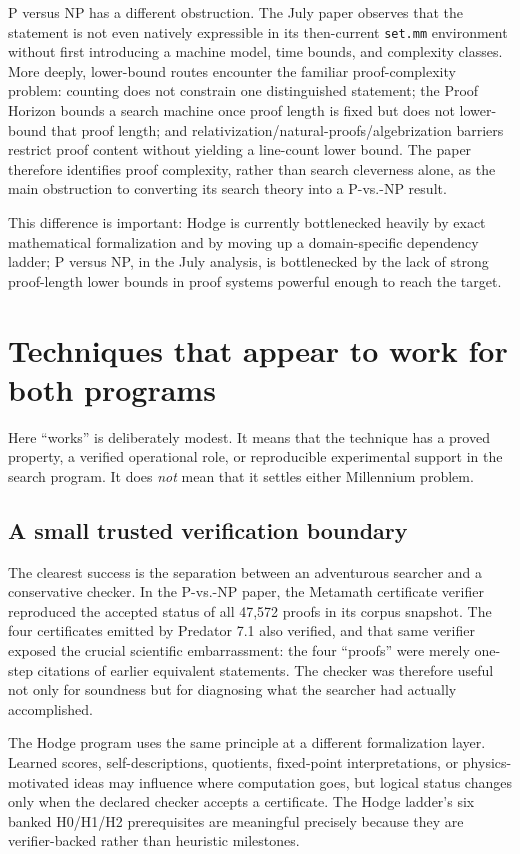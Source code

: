 \documentclass[11pt]{article}
\begin{document}
P versus NP has a different obstruction.  The July paper observes that the statement is not even natively expressible in its then-current \texttt{set.mm} environment without first introducing a machine model, time bounds, and complexity classes.  More deeply, lower-bound routes encounter the familiar proof-complexity problem: counting does not constrain one distinguished statement; the Proof Horizon bounds a search machine once proof length is fixed but does not lower-bound that proof length; and relativization/natural-proofs/algebrization barriers restrict proof content without yielding a line-count lower bound.  The paper therefore identifies proof complexity, rather than search cleverness alone, as the main obstruction to converting its search theory into a P-vs.-NP result.

This difference is important: Hodge is currently bottlenecked heavily by exact mathematical formalization and by moving up a domain-specific dependency ladder; P versus NP, in the July analysis, is bottlenecked by the lack of strong proof-length lower bounds in proof systems powerful enough to reach the target.

\section{Techniques that appear to work for both programs}

Here ``works'' is deliberately modest.  It means that the technique has a proved property, a verified operational role, or reproducible experimental support in the search program.  It does \emph{not} mean that it settles either Millennium problem.

\subsection{A small trusted verification boundary}

The clearest success is the separation between an adventurous searcher and a conservative checker.  In the P-vs.-NP paper, the Metamath certificate verifier reproduced the accepted status of all 47,572 proofs in its corpus snapshot.  The four certificates emitted by Predator 7.1 also verified, and that same verifier exposed the crucial scientific embarrassment: the four ``proofs'' were merely one-step citations of earlier equivalent statements.  The checker was therefore useful not only for soundness but for diagnosing what the searcher had actually accomplished.

The Hodge program uses the same principle at a different formalization layer.  Learned scores, self-descriptions, quotients, fixed-point interpretations, or physics-motivated ideas may influence where computation goes, but logical status changes only when the declared checker accepts a certificate.  The Hodge ladder's six banked H0/H1/H2 prerequisites are meaningful precisely because they are verifier-backed rather than heuristic milestones.
\end{document}
